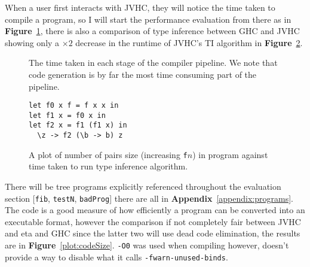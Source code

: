 \documentclass[float=false, crop=false]{standalone}
\newlength\gwidth
\newlength\gheight
\newcommand{\namefig}{\textbf{Figure}~}
\newcommand{\importMGraph}[3]{\setlength{\gwidth}{#2}\setlength{\gheight}{#3}{#1}}
\begin{document}
When a user first interacts with JVHC, they will notice the time taken to compile a program, so I will
start the performance evaluation from there as in \namefig\ref{plot:TimeInStages}, there is also a comparison of type inference between
GHC and JVHC showing only a $\times 2$ decrease in the runtime of JVHC's TI algorithm in 
\namefig\ref{Plot:tiTime}.


  \begin{samepage}
\begin{figure}[ht]
  \centering
      \importMGraph{plotStage.tex}{0.7\textwidth}{0.25\textwidth}
      \caption[Average time taken for an average program
      at each stage in the compiler]{The time taken in each stage of the compiler pipeline. We note that
      code generation is by far the most time consuming part of the pipeline.}
      \label{plot:TimeInStages}
\end{figure}
  \end{samepage}

  \begin{figure}
  \begin{samepage}
  \importMGraph{tiTime.tex}{0.93\textwidth}{0.4\textwidth}
  \begin{verbatim}
let f0 x f = f x x in
let f1 x = f0 x in
let f2 x = f1 (f1 x) in
  \z -> f2 (\b -> b) z
  \end{verbatim}
  \caption[Plot of type inference runtime as a function of input size]
  {A plot of number of pairs size (increasing \texttt{f$n$}) 
    in program against time taken to run type inference algorithm.}
  \label{Plot:tiTime}
\end{samepage}
\end{figure}

There will be tree programs explicitly referenced throughout the evaluation section 
[\texttt{fib}, \texttt{testN}, \texttt{badProg}] there are all in 
\textbf{Appendix}~\ref{appendix:programs}.
The code is a good measure of how efficiently a program can be converted
into an executable format, however the comparison if not completely fair
between JVHC and eta and GHC since the latter two will use dead code 
elimination, the results are in \namefig\ref{plot:codeSize}. \texttt{-O0} was used when compiling however, 
\cite{haskell-flag-ref} doesn't provide a way to disable what it calls
\texttt{-fwarn-unused-binds}.
\end{document}
